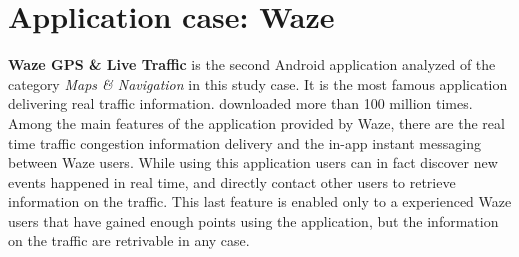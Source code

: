 \newpage
\section{Application case: Waze}
	\par \textbf{Waze GPS \& Live Traffic} is the second Android application analyzed of the category \textit{Maps \& Navigation} in this study case. It is the most famous application delivering real traffic information. downloaded more than 100 million times. Among the main features of the application provided by Waze, there are the real time traffic congestion information delivery and the in-app instant messaging between Waze users. While using this application users can in fact discover new events happened in real time, and directly contact other users to retrieve information on the traffic. This last feature is enabled only to a experienced Waze users that have gained enough points using the application, but the information on the traffic are retrivable in any case. 
	
